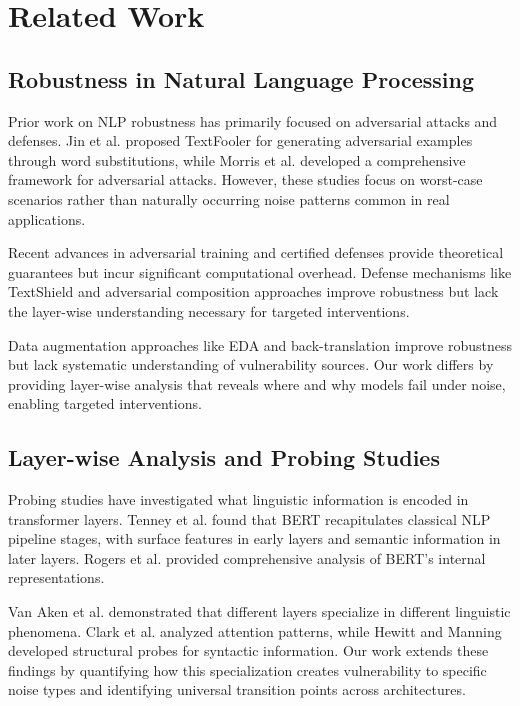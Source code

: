 \documentclass{article}
\begin{document}
\section{Related Work}

\subsection{Robustness in Natural Language Processing}

Prior work on NLP robustness has primarily focused on adversarial attacks and defenses. Jin et al. \cite{jin2020bert} proposed TextFooler for generating adversarial examples through word substitutions, while Morris et al. \cite{morris2020textattack} developed a comprehensive framework for adversarial attacks. However, these studies focus on worst-case scenarios rather than naturally occurring noise patterns common in real applications.

Recent advances in adversarial training \cite{madry2018towards} and certified defenses \cite{cohen2019certified} provide theoretical guarantees but incur significant computational overhead. Defense mechanisms like TextShield \cite{textshield2023} and adversarial composition approaches \cite{hendrycks2020augmax} improve robustness but lack the layer-wise understanding necessary for targeted interventions.

Data augmentation approaches like EDA \cite{wei2019eda} and back-translation \cite{edunov2018understanding} improve robustness but lack systematic understanding of vulnerability sources. Our work differs by providing layer-wise analysis that reveals where and why models fail under noise, enabling targeted interventions.

\subsection{Layer-wise Analysis and Probing Studies}

Probing studies have investigated what linguistic information is encoded in transformer layers. Tenney et al. \cite{tenney2019bert} found that BERT recapitulates classical NLP pipeline stages, with surface features in early layers and semantic information in later layers. Rogers et al. \cite{rogers2020primer} provided comprehensive analysis of BERT's internal representations.

Van Aken et al. \cite{vanaken2019bert} demonstrated that different layers specialize in different linguistic phenomena. Clark et al. \cite{clark2019what} analyzed attention patterns, while Hewitt and Manning \cite{hewitt2019structural} developed structural probes for syntactic information. Our work extends these findings by quantifying how this specialization creates vulnerability to specific noise types and identifying universal transition points across architectures.
\end{document}
